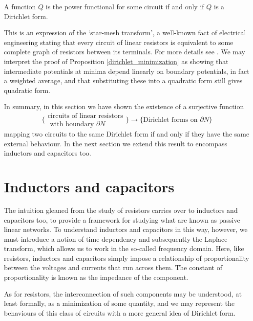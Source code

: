\begin{proposition}
  A function $Q$ is the power functional for some circuit if and only if $Q$ is a
  Dirichlet form.
\end{proposition}

This is an expression of the `star-mesh transform', a well-known fact of
electrical engineering stating that every circuit of linear resistors is
equivalent to some complete graph of resistors between its terminals. For more
details see \cite{vLO}. We may interpret the proof of Proposition
\ref{dirichlet_minimization} as showing that intermediate potentials at minima
depend linearly on boundary potentials, in fact a weighted average, and that
substituting these into a quadratic form still gives quadratic form.

\bigskip

In summary, in this section we have shown the existence of a surjective function
\[
  \bigg\{\begin{array}{c} \mbox{circuits of linear resistors} \\ \mbox{ with
    boundary $\partial N$} \end{array} \bigg\} \longrightarrow \bigg\{
    \mbox{Dirichlet forms on $\partial N$}\bigg\}
\]
mapping two circuits to the same Dirichlet form if and only if they have the same
external behaviour.  In the next section we extend this result to encompass
inductors and capacitors too.


\section{Inductors and capacitors} \label{sec:plcs}
The intuition gleaned from the study of resistors carries over to inductors and
capacitors too, to provide a framework for studying what are known as passive
linear networks. To understand inductors and capacitors in this way, however, we
must introduce a notion of time dependency and subsequently the Laplace
transform, which allows us to work in the so-called frequency domain. Here, like
resistors, inductors and capacitors simply impose a relationship of
proportionality between the voltages and currents that run across them. The
constant of proportionality is known as the impedance of the component.

As for resistors, the interconnection of such components may be understood, at
least formally, as a minimization of some quantity, and we may represent the
behaviours of this class of circuits with a more general idea of Dirichlet form.


